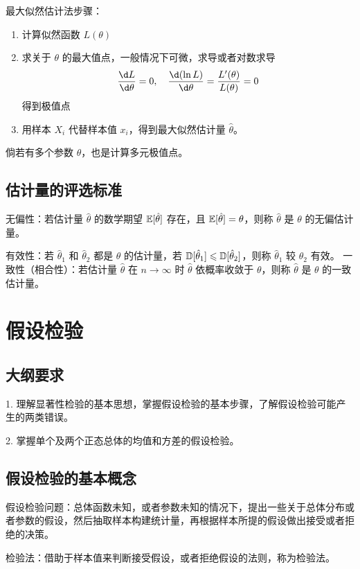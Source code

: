最大似然估计法步骤：
\begin{enumerate}
	\item 计算似然函数 $L(\theta)$
	\item 求关于 $\theta$ 的最大值点，一般情况下可微，求导或者对数求导
	      \[ \frac{\d L}{\d \theta} = 0, \quad \frac{\d (\ln L)}{\d \theta} = \frac{L'(\theta)}{L(\theta)} = 0 \]
	      得到极值点
	\item 用样本 $X_i$ 代替样本值 $x_i$，得到最大似然估计量 $\hat{\theta}$。
\end{enumerate}
倘若有多个参数 $\theta$，也是计算多元极值点。

\subsection{估计量的评选标准}

无偏性：若估计量 $\hat{\theta}$ 的数学期望 $\mathbb{E}[\hat{\theta}]$ 存在，且 $\mathbb{E}[\hat{\theta}] = \theta$，则称 $\hat{\theta}$ 是 $\theta$ 的无偏估计量。

有效性：若 $\hat{\theta}_1$ 和 $\hat{\theta}_2$ 都是 $\theta$ 的估计量，若 $\mathbb{D}[\hat{\theta}_1] \leqslant \mathbb{D}[\hat{\theta}_2]$，则称 $\hat{\theta}_1$ 较 $\hat{\theta}_2$ 有效。
一致性（相合性）：若估计量 $\hat{\theta}$ 在 $n \to \infty$ 时 $\hat{\theta}$ 依概率收敛于 $\theta$，则称 $\hat{\theta}$ 是 $\theta$ 的一致估计量。

\section{假设检验}

\subsection{大纲要求}

1. 理解显著性检验的基本思想，掌握假设检验的基本步骤，了解假设检验可能产生的两类错误。

2. 掌握单个及两个正态总体的均值和方差的假设检验。

\subsection{假设检验的基本概念}

假设检验问题：总体函数未知，或者参数未知的情况下，提出一些关于总体分布或者参数的假设，然后抽取样本构建统计量，再根据样本所提的假设做出接受或者拒绝的决策。

检验法：借助于样本值来判断接受假设，或者拒绝假设的法则，称为检验法。

